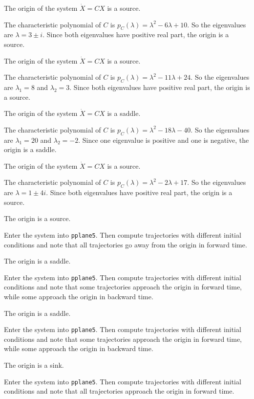  \ans The origin of the system $\dot{X} = CX$ is a source.

\soln The characteristic polynomial of $C$ is
$p_C(\lambda) = \lambda^2 - 6\lambda + 10$.  So the eigenvalues are
$\lambda = 3 \pm i$.  Since both eigenvalues have positive real part,
the origin is a source.

 \ans The origin of the system $\dot{X} = CX$ is a source.

\soln The characteristic polynomial of $C$ is
$p_C(\lambda) = \lambda^2 - 11\lambda + 24$.  So the eigenvalues are
$\lambda_1 = 8$ and $\lambda_2 = 3$.  Since both eigenvalues have
positive real part, the origin is a source.

 \ans The origin of the system $\dot{X} = CX$ is a saddle.

\soln The characteristic polynomial of $C$ is
$p_C(\lambda) = \lambda^2 - 18\lambda - 40$.  So the eigenvalues are
$\lambda_1 = 20$ and $\lambda_2 = -2$.  Since one eigenvalue is positive
and one is negative, the origin is a saddle.

 \ans The origin of the system $\dot{X} = CX$ is a source.

\soln The characteristic polynomial of $C$ is
$p_C(\lambda) = \lambda^2 - 2\lambda + 17$.  So the eigenvalues are
$\lambda = 1 \pm 4i$.  Since both eigenvalues have positive real part,
the origin is a source.

 \ans The origin is a source.

\soln Enter the system into {\tt pplane5}.  Then compute trajectories with
different initial conditions and note that all trajectories go away from
the origin in forward time.

 \ans The origin is a saddle.

\soln Enter the system into {\tt pplane5}.  Then compute trajectories with
different initial conditions and note that some trajectories approach the
origin in forward time, while some approach the origin in backward time.

 \ans The origin is a saddle.

\soln Enter the system into {\tt pplane5}.  Then compute trajectories with
different initial conditions and note that some trajectories approach the
origin in forward time, while some approach the origin in backward time.

 \ans The origin is a sink.

\soln Enter the system into {\tt pplane5}.  Then compute trajectories with
different initial conditions and note that all trajectories approach
the origin in forward time.


